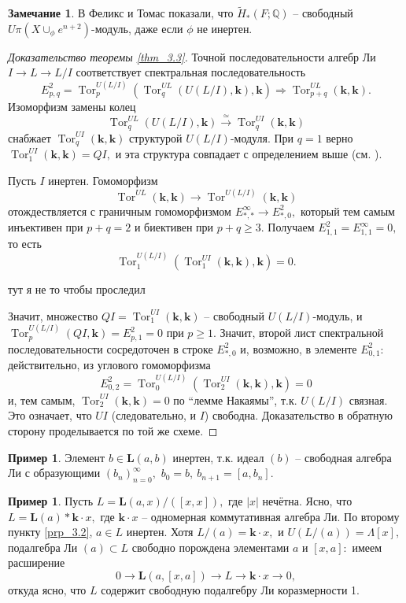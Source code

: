 \documentclass[10pt,a4paper]{article}
\DeclareMathOperator{\Tor}{Tor}
\def\QQ{\mathbb{Q}}
\def\L{\mathbf{L}}
\def\k{\mathbf{k}}
\theoremstyle{definition}
\newtheorem{rmk}[thm]{Замечание}
\newtheorem{exm}[thm]{Пример}
\begin{document}
\begin{rmk}\label{rmk_3.5}
В \cite{9} Феликс и Томас показали, что $\widetilde{H}_*(F;\QQ)$ -- свободный $U\pi(X\cup_\phi e^{n+2})$-модуль, даже если $\phi$ не инертен.
\end{rmk}
\begin{proof}[Доказательство теоремы \ref{thm_3.3}]
Точной последовательности алгебр Ли $I\to L\to L/I$ соответствует спектральная последовательность
$$E_{p,q}^2 = \Tor_p^{U(L/I)}(\Tor_q^{UL}(U(L/I),\k),\k)\Rightarrow \Tor_{p+q}^{UL}(\k,\k).$$
Изоморфизм замены колец $$\Tor_q^{UL}(U(L/I),\k)\overset{\simeq}{\longrightarrow} \Tor_q^{UI}(\k,\k)$$ снабжает $\Tor_q^{UI}(\k,\k)$ структурой $U(L/I)$-модуля. При $q=1$ верно $\Tor_1^{UI}(\k,\k)=QI,$ и эта структура совпадает с определением выше (см. \cite[3.12]{7}).

Пусть $I$ инертен. Гомоморфизм $$\Tor^{UL}(\k,\k)\to \Tor^{U(L/I)}(\k,\k)$$ отождествляется с граничным гомоморфизмом $E_{*,*}^\infty\to E_{*,0}^2,$ который тем самым инъективен при $p+q=2$ и биективен при $p+q\ge 3.$ Получаем $E_{1,1}^2=E_{1,1}^\infty =0,$ то есть
$$\Tor_1^{U(L/I)}(\Tor_1^{UI}(\k,\k),\k)=0.$$

{\color{red} тут я не то чтобы проследил}

Значит, множество $QI=\Tor_1^{UI}(\k,\k)$ -- свободный $U(L/I)$-модуль, и $\Tor_p^{U(L/I)}(QI,\k)=E_{p,1}^2=0$ при $p\geq 1.$ Значит, второй лист спектральной последовательности сосредоточен в строке $E_{*,0}^2$ и, возможно, в элементе $E_{0,1}^2:$ действительно, из углового гомоморфизма
$$E_{0,2}^2=\Tor_0^{U(L/I)}(\Tor_2^{UI}(\k,\k),\k)=0$$
и, тем самым, $\Tor_2^{UI}(\k,\k)=0$ по ``лемме Накаямы'', т.к. $U(L/I)$ связная. Это означает, что $UI$ (следовательно, и $I$) свободна. Доказательство в обратную сторону проделывается по той же схеме.
\end{proof}
\begin{exm}\label{exm_3.6} Элемент $b\in\L(a,b)$ инертен, т.к. идеал $(b)$ -- свободная алгебра Ли с образующими $(b_n)_{n=0}^\infty,$ $b_0=b,~b_{n+1}=[a,b_n].$
\end{exm}
\begin{exm}\label{exm_3.7}
Пусть $L=\L(a,x)/([x,x]),$ где $|x|$ нечётна. Ясно, что $L=\L(a)\ast \k\cdot x,$ где $\k\cdot x$ -- одномерная коммутативная алгебра Ли. По второму пункту \ref{prp_3.2}, $a\in L$ инертен. Хотя $L/(a)=\k\cdot x,$ и $U(L/(a))=\Lambda[x],$ подалгебра Ли $(a)\subset L$ свободно порождена элементами $a$ и $[x,a]:$ имеем расширение
$$0\to \L(a,[x,a])\to L\to \k\cdot x\to 0,$$ откуда ясно, что $L$ содержит свободную подалгебру Ли коразмерности 1.
\end{exm}
\end{document}
